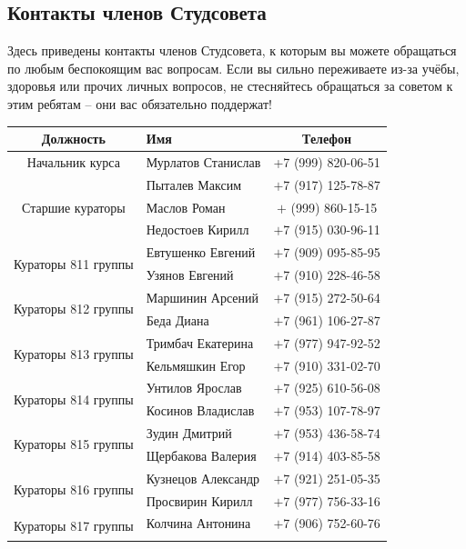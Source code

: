 \documentclass[14pt]{extarticle}
\begin{document}
\subsection{Контакты членов Студсовета}
{
\small
Здесь приведены контакты членов Студсовета,
к которым вы можете обращаться по любым беспокоящим вас
вопросам. Если вы сильно переживаете из-за учёбы, здоровья
или прочих личных вопросов, не стесняйтесь обращаться за
советом к этим ребятам -- они вас обязательно поддержат!
}
\begin{center}
\small
\renewcommand{\arraystretch}{1.1}
\begin{tabular}{ |c|l|c| }
\hline
\textbf{Должность} & \textbf{Имя} & \textbf{Телефон} \\ \hline
Начальник курса & Мурлатов Станислав & +7 (999) 820-06-51 \\ \hline
\multirow{3}{*}{Старшие кураторы}
& Пыталев Максим & $+$7 (917) 125-78-87 \\ \cline{2-3}
& Маслов Роман & $+$ (999) 860-15-15 \\ \cline{2-3}
& Недостоев Кирилл & $+$7 (915) 030-96-11 \\ \hline \hline
\multirow{2}{*}{Кураторы 811 группы}
& Евтушенко Евгений & $+$7 (909) 095-85-95 \\ \cline{2-3}
& Узянов Евгений & $+$7 (910) 228-46-58 \\ \hline
\multirow{2}{*}{Кураторы 812 группы}
& Маршинин Арсений & $+$7 (915) 272-50-64 \\ \cline{2-3}
& Беда Диана & $+$7 (961) 106-27-87 \\ \hline
\multirow{2}{*}{Кураторы 813 группы}
& Тримбач Екатерина & $+$7 (977) 947-92-52 \\ \cline{2-3}
& Кельмяшкин Егор & $+$7 (910) 331-02-70 \\ \hline
\multirow{2}{*}{Кураторы 814 группы}
& Унтилов Ярослав & $+$7 (925) 610-56-08 \\ \cline{2-3}
& Косинов Владислав & $+$7 (953) 107-78-97 \\ \hline
\multirow{2}{*}{Кураторы 815 группы}
& Зудин Дмитрий & $+$7 (953) 436-58-74 \\ \cline{2-3}
& Щербакова Валерия & $+$7 (914) 403-85-58 \\ \hline
\multirow{2}{*}{Кураторы 816 группы}
& Кузнецов Александр & $+$7 (921) 251-05-35 \\ \cline{2-3}
& Просвирин Кирилл & $+$7 (977) 756-33-16 \\ \hline
\multirow{2}{*}{Кураторы 817 группы}
& Колчина Антонина & $+$7 (906) 752-60-76 \\ \cline{2-3}

\end{tabular}
\end{center}
\end{document}
